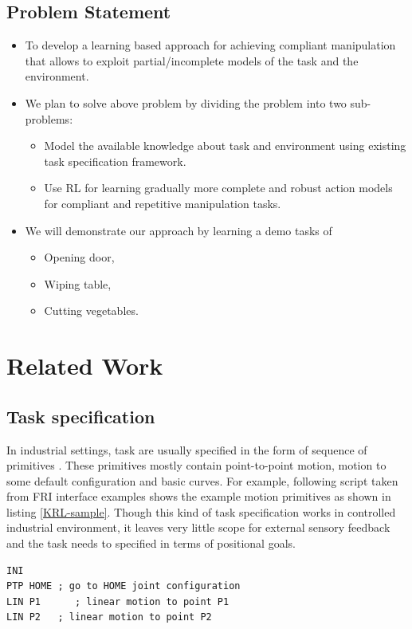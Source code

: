 \documentclass[thesis]{mas_proposal}
\begin{document}
\section{Problem Statement}
\begin{itemize}
	\item To develop a learning based approach for achieving compliant manipulation that allows to exploit partial/incomplete models
	of the task and the environment.
	\item We plan to solve above problem by dividing the problem into two sub-problems:
	\begin{itemize}
		\item Model the available knowledge about task and environment using existing task specification framework.
		\item Use RL for learning gradually more complete and robust action models
for compliant and repetitive manipulation tasks.
	\end{itemize}
    \item We will demonstrate our approach by learning a demo tasks of 
    \begin{itemize}
    	\item Opening door,
    	\item Wiping table,
    	\item Cutting vegetables.
    \end{itemize}
\end{itemize}


\chapter{Related Work}
\section{Task specification}
In industrial settings, task are usually specified in the form of sequence of primitives \cite{leidner2017cognitive}. These primitives mostly contain point-to-point motion, motion to some default configuration and basic curves. For example, following script taken from FRI interface examples shows the example motion primitives as shown in listing \ref{KRL-sample}. Though this kind of task specification works in controlled industrial environment, it leaves very little scope for external sensory feedback and the task needs to specified in terms of positional goals.

\begin{lstlisting}[label=KRL-sample,caption=KUKA Robot Language code]
INI
PTP HOME ; go to HOME joint configuration
LIN P1      ; linear motion to point P1
LIN P2	 ; linear motion to point P2
\end{lstlisting}
\end{document}

